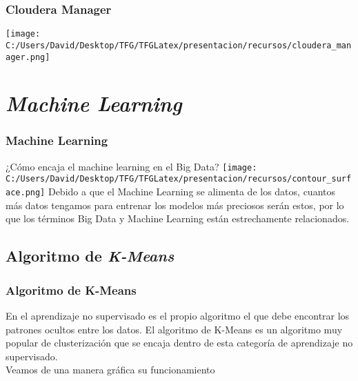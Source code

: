 \documentclass{beamer}
\begin{document}
\begin{frame}
  \frametitle{Cloudera Manager}
  \texttt{[image: C:/Users/David/Desktop/TFG/TFGLatex/presentacion/recursos/cloudera\_manager.png]}
\end{frame}

\section{\textit{Machine Learning}}

\begin{frame} %
\frametitle{Machine Learning}
¿Cómo encaja el machine learning en el Big Data?
\centering
\texttt{[image: C:/Users/David/Desktop/TFG/TFGLatex/presentacion/recursos/contour\_surface.png]}
Debido a que el Machine Learning se alimenta de los datos, cuantos más datos tengamos para entrenar los modelos más 
preciosos serán estos, por lo que los términos Big Data y Machine Learning están estrechamente relacionados.
\end{frame}


\subsection{Algoritmo de \textit{K-Means}}

\begin{frame}[fragile] %
\frametitle{Algoritmo de K-Means}
En el aprendizaje no supervisado es el propio algoritmo el que debe encontrar los patrones ocultos entre los datos.
El algoritmo de K-Means es un algoritmo muy popular de clusterización que se encaja dentro de esta categoría de 
aprendizaje no supervisado.\\
Veamos de una manera gráfica su funcionamiento
\end{frame}
\end{document}
